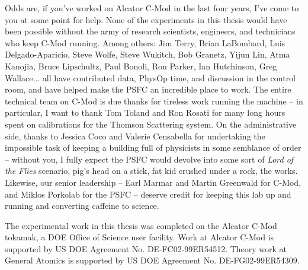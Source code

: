 Odds are, if you've worked on Alcator C-Mod in the last four years, I've come to you at some point for help.  None of the experiments in this thesis would have been possible without the army of research scientists, engineers, and technicians who keep C-Mod running.  Among others: Jim Terry, Brian LaBombard, Luis Delgado-Aparicio, Steve Wolfe, Steve Wukitch, Bob Granetz, Yijun Lin, Atma Kanojia, Bruce Lipschultz, Paul Bonoli, Ron Parker, Ian Hutchinson, Greg Wallace... all have contributed data, PhysOp time, and discussion in the control room, and have helped make the PSFC an incredible place to work.  The entire technical team on C-Mod is due thanks for tireless work running the machine -- in particular, I want to thank Tom Toland and Ron Rosati for many long hours spent on calibrations for the Thomson Scattering system.  On the administrative side, thanks to Jessica Coco and Valerie Censabella for undertaking the impossible task of keeping a building full of physicists in some semblance of order -- without you, I fully expect the PSFC would devolve into some sort of \emph{Lord of the Flies} scenario, pig's head on a stick, fat kid crushed under a rock, the works.  Likewise, our senior leadership -- Earl Marmar and Martin Greenwald for C-Mod, and Miklos Porkolab for the PSFC -- deserve credit for keeping this lab up and running and converting caffeine to science.



The experimental work in this thesis was completed on the Alcator C-Mod tokamak, a DOE Office of Science user facility.  Work at Alcator C-Mod is supported by US DOE Agreement No. DE-FC02-99ER54512.  Theory work at General Atomics is supported by US DOE Agreement No. DE-FG02-99ER54309.